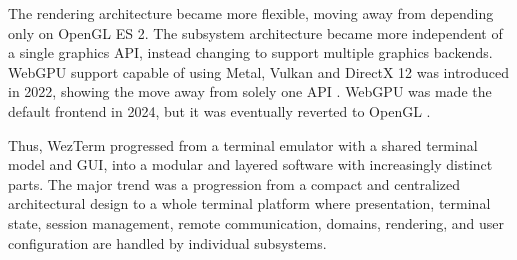 The rendering architecture became more flexible, moving away from depending only on OpenGL ES 2. The subsystem architecture became more independent of a single graphics API, instead changing to support multiple graphics backends. WebGPU support capable of using Metal, Vulkan and DirectX 12 was introduced in 2022, showing the move away from solely one API \cite{changelog-2022}. WebGPU was made the default frontend in 2024, but it was eventually reverted to OpenGL \cite{changelog-2024}.

Thus, WezTerm progressed from a terminal emulator with a shared terminal model and GUI, into a modular and layered software with increasingly distinct parts. The major trend was a progression from a compact and centralized architectural design to a whole terminal platform where presentation, terminal state, session management, remote communication, domains, rendering, and user configuration are handled by individual subsystems. 




